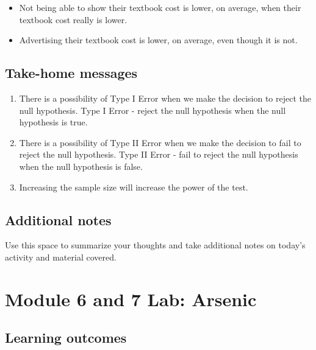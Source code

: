 \documentclass[
]{report}
\begin{document}
\begin{itemize}
\item
  Not being able to show their textbook cost is lower, on average, when their textbook cost really is lower.
\item
  Advertising their textbook cost is lower, on average, even though it is not.
\end{itemize}

\vspace{0.8in}

\subsection{Take-home messages}\label{take-home-messages-4}

\begin{enumerate}
\def\labelenumi{\arabic{enumi}.}
\item
  There is a possibility of Type I Error when we make the decision to reject the null hypothesis. Type I Error - reject the null hypothesis when the null hypothesis is true.
\item
  There is a possibility of Type II Error when we make the decision to fail to reject the null hypothesis. Type II Error - fail to reject the null hypothesis when the null hypothesis is false.
\item
  Increasing the sample size will increase the power of the test.
\end{enumerate}

\subsection{Additional notes}\label{additional-notes-4}

Use this space to summarize your thoughts and take additional notes on today's activity and material covered.

\newpage

\section{Module 6 and 7 Lab: Arsenic}\label{module-6-and-7-lab-arsenic}


\subsection{Learning outcomes}\label{learning-outcomes-5}
\end{document}
